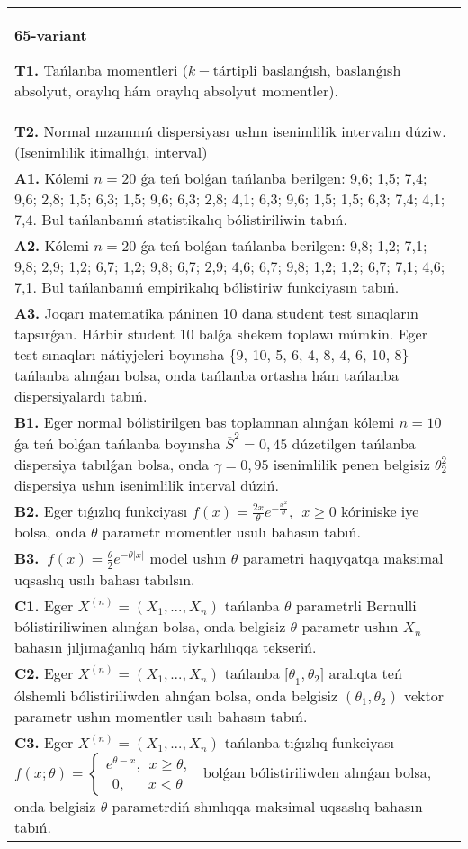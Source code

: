 \documentclass{article}
\begin{document}
\begin{tabular}{m{17cm}}
\textbf{65-variant}
\newline

\textbf{T1.} 
Tańlanba momentleri (\(k -\)tártipli baslanǵısh, baslanǵısh absolyut, oraylıq hám oraylıq absolyut momentler).
 \\
\textbf{T2.} 
Normal nızamnıń dispersiyası ushın isenimlilik intervalın dúziw. (Isenimlilik itimallıǵı, interval)
 \\
\textbf{A1.} 
Kólemi \(n = 20\) ǵa teń bolǵan tańlanba berilgen: 9,6; 1,5; 7,4; 9,6; 2,8; 1,5; 6,3; 1,5; 9,6; 6,3; 2,8; 4,1; 6,3; 9,6; 1,5; 1,5; 6,3; 7,4; 4,1; 7,4. Bul tańlanbanıń statistikalıq bólistiriliwin tabıń.
 \\
\textbf{A2.} 
Kólemi \(n = 20\) ǵa teń bolǵan tańlanba berilgen: 9,8; 1,2; 7,1; 9,8; 2,9; 1,2; 6,7; 1,2; 9,8; 6,7; 2,9; 4,6; 6,7; 9,8; 1,2; 1,2; 6,7; 7,1; 4,6; 7,1. Bul tańlanbanıń empirikalıq bólistiriw funkciyasın tabıń.
 \\
\textbf{A3.} 
Joqarı matematika páninen 10 dana student test sınaqların tapsırǵan. Hárbir student 10 balǵa shekem toplawı múmkin. Eger test sınaqları nátiyjeleri boyınsha \{9, 10, 5, 6, 4, 8, 4, 6, 10, 8\} tańlanba alınǵan bolsa, onda tańlanba ortasha hám tańlanba dispersiyalardı tabıń.
 \\
\textbf{B1.} 
Eger normal bólistirilgen bas toplamnan alınǵan kólemi \(n = 10\) ǵa teń bolǵan tańlanba boyınsha \({\overline{S}}^{2} = 0,45\) dúzetilgen tańlanba dispersiya tabılǵan bolsa, onda \(\gamma = 0,95\) isenimlilik penen belgisiz \(\theta_{2}^{2}\) dispersiya ushın isenimlilik interval dúziń.
 \\
\textbf{B2.} 
Eger tıǵızlıq funkciyası \(f(x) = \frac{2x}{\theta}e^{- \frac{x^{2}}{\theta}},\ \ x \geq 0\) kóriniske iye bolsa, onda \(\theta\) parametr momentler usulı bahasın tabıń.
 \\
\textbf{B3.} 
\(\ f(x) = \frac{\theta}{2}e^{- \theta|x|}\) model ushın \(\theta\) parametri haqıyqatqa maksimal uqsaslıq usılı bahası tabılsın.
 \\
\textbf{C1.} 
Eger \(X^{(n)} = \left( X_{1},...,X_{n} \right)\) tańlanba \(\theta\) parametrli Bernulli bólistiriliwinen alınǵan bolsa, onda belgisiz \(\theta\) parametr ushın \(X_{n}\) bahasın jıljımaǵanlıq hám tiykarlılıqqa tekseriń.
 \\
\textbf{C2.} 
Eger \(X^{(n)} = \left( X_{1},...,X_{n} \right)\) tańlanba \({\lbrack\theta}_{1},\theta_{2}\rbrack\) aralıqta teń ólshemli bólistiriliwden alınǵan bolsa, onda belgisiz \(\left( \theta_{1},\theta_{2} \right)\) vektor parametr ushın momentler usılı bahasın tabıń.
 \\
\textbf{C3.} 
Eger \(X^{(n)} = \left( X_{1},...,X_{n} \right)\) tańlanba tıǵızlıq funkciyası
$f(x;\theta) = \left\{ \begin{matrix}
e^{\theta - x},\ \ x \geq \theta, \\
\ \ 0,\ \ \ \ \ \ \ x < \theta
\end{matrix} \right.\ $
bolǵan bólistiriliwden alınǵan bolsa, onda belgisiz \(\theta\) parametrdiń shınlıqqa maksimal uqsaslıq bahasın tabıń.
 \\

\end{tabular}
\end{document}
